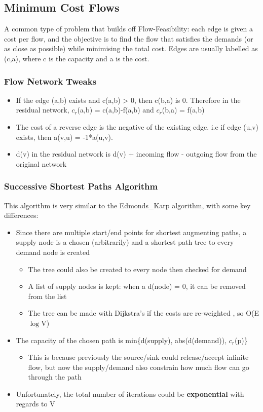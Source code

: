 \subsection{Minimum Cost Flows}
A common type of problem that builds off Flow-Feasibility: each edge is given a cost per flow, and the objective is to find the flow that satisfies the demands (or as close as possible) while minimising the total cost. Edges are usually labelled as (c,a), where c is the capacity and a is the cost. 

\subsubsection{Flow Network Tweaks}
\begin{itemize}
    \item If the edge (a,b) exists and c(a,b) > 0, then c(b,a) is 0. Therefore in the residual network, $c_r$(a,b) = c(a,b)-f(a,b) and $c_r$(b,a) = f(a,b)
    \item The cost of a reverse edge is the negative of the existing edge. i.e if edge (u,v) exists, then a(v,u) = -1*a(u,v). 
    \item d(v) in the residual network is d(v) + incoming flow - outgoing flow from the original network
\end{itemize}

\subsubsection{Successive Shortest Paths Algorithm}
This algorithm is very similar to the Edmonds\_Karp algorithm, with some key differences:
\begin{itemize}
    \item Since there are multiple start/end points for shortest augmenting paths, a supply node is a chosen (arbitrarily) and a shortest path tree to every demand node is created
    \begin{itemize}
        \item The tree could also be created to every node then checked for demand
        \item A list of supply nodes is kept: when a d(node) = 0, it can be removed from the list
        \item The tree can be made with Dijkstra's if the costs are re-weighted , so O(E $\log$V)
    \end{itemize}
    \item The capacity of the chosen path is min\{d(supply), abs(d(demand)), $c_r$(p)\}
    \begin{itemize}
        \item This is because previously the source/sink could release/accept infinite flow, but now the supply/demand also constrain how much flow can go through the path
    \end{itemize}
    \item Unfortunately, the total number of iterations could be \textbf{exponential} with regards to V
\end{itemize}

